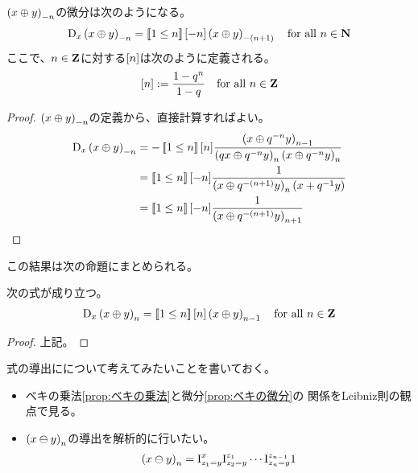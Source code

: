 {	$\mathinner{({x\oplus y})}_{-n}$の微分は次のようになる。
	\begin{equation*}\begin{split}
		{\mathinner{\operatorname{D}}}_x\mathinner{({x\oplus y})}_{-n} = \mathinner{[\![1\le n]\!]}{\mathinner{[{-n}]}}\mathinner{({x\oplus y})}_{-\mathinner{({n+1})}}
		\quad\text{for all } n\in\mathbf{N}
	\end{split}\end{equation*}
	ここで、$n\in\mathbf{Z}$に対する${\mathinner{[{n}]}}$は次のように定義される。
	\begin{equation*}\begin{split}
		{\mathinner{[{n}]}} := \frac{1 - q^n}{1 - q} \quad\text{for all } n\in\mathbf{Z}
	\end{split}\end{equation*}
	\begin{proof} %
		$\mathinner{({x\oplus y})}_{-n}$の定義から、直接計算すればよい。
		\begin{equation*}\begin{split}
			{\mathinner{\operatorname{D}}}_x\mathinner{({x\oplus y})}_{-n} &= - \mathinner{[\![1\le n]\!]}{\mathinner{[{n}]}}
				\frac{\mathinner{({x\oplus q^{-n}y})}_{n-1}}
				{\mathinner{({qx\oplus q^{-n}y})}_n\mathinner{({x\oplus q^{-n}y})}_n} \\
			&= \mathinner{[\![1\le n]\!]}{\mathinner{[{-n}]}}\frac{1}
				{\mathinner{({x\oplus q^{-\mathinner{({n+1})}}y})}_n\mathinner{({x + q^{-1}y})}} \\
			&= \mathinner{[\![1\le n]\!]}{\mathinner{[{-n}]}}\frac{1}{\mathinner{({x\oplus q^{-\mathinner{({n+1})}}y})}_{n+1}} \\
		\end{split}\end{equation*}
	\end{proof} %
	この結果は次の命題にまとめられる。

	\begin{proposition}[ベキの微分]\label{prop:ベキの微分} %
		次の式が成り立つ。
		\begin{equation*}\begin{split}
			{\mathinner{\operatorname{D}}}_x\mathinner{({x\oplus y})}_n = \mathinner{[\![1\le n]\!]}{\mathinner{[{n}]}}\mathinner{({x\oplus y})}_{n-1}
			\quad\text{for all } n\in\mathbf{Z}
		\end{split}\end{equation*}
	\end{proposition} %
	\begin{proof} %
		上記。
	\end{proof} %

	\begin{todo}[導出の方法]\label{todo:導出の方法} %
		式の導出にについて考えてみたいことを書いておく。
		\begin{itemize}\setlength{\itemsep}{-1mm} %
			\item ベキの乗法\ref{prop:ベキの乗法}と微分\ref{prop:ベキの微分}の
			関係をLeibniz則の観点で見る。
			\item $\mathinner{({x\ominus y})}_n$の導出を解析的に行いたい。
			\begin{equation*}\begin{split}
				\mathinner{({x\ominus y})}_n = {\mathinner{\operatorname{I}}}_{z_1=y}^x{\mathinner{\operatorname{I}}}_{z_2=y}^{z_1}
				\cdots{\mathinner{\operatorname{I}}}_{z_n=y}^{z_{n-1}}1
			\end{split}\end{equation*}
		\end{itemize} %
	\end{todo} %

}

